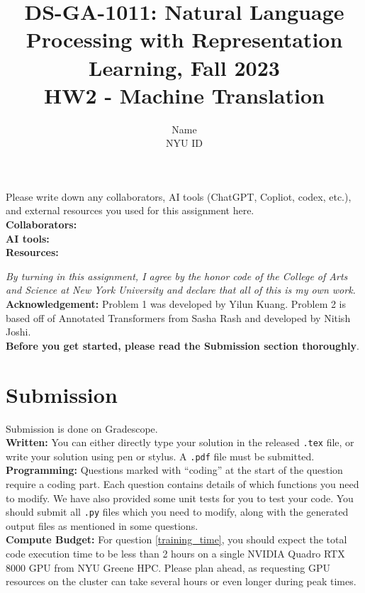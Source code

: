 \documentclass{article}
\title{\textbf{DS-GA-1011: Natural Language Processing with Representation Learning, Fall 2023}\\HW2 - Machine Translation}
\author{Name \\
NYU ID}
\date{}
\theoremstyle{case}
\theoremstyle{definition}
\begin{document}
\maketitle
\begin{tcolorbox}
Please write down any collaborators, AI tools (ChatGPT, Copliot, codex, etc.), and external resources you used for this assignment here. \\
\textbf{Collaborators:} \\
\textbf{AI tools:} \\
\textbf{Resources:} 
\end{tcolorbox}

\textit{By turning in this assignment, I agree by the honor code of the College of Arts and Science at New York University and declare
that all of this is my own work.} \\

\textbf{Acknowledgement:} Problem 1 was developed by Yilun Kuang. Problem 2 is based off of Annotated Transformers from Sasha Rash and developed by Nitish Joshi. \\

\textbf{Before you get started, please read the Submission section thoroughly}.

\section*{Submission}
Submission is done on Gradescope. \\

\textbf{Written:} You can either directly type your solution in the released \texttt{.tex} file,
or write your solution using pen or stylus. 
A \texttt{.pdf} file must be submitted.\\

\textbf{Programming:} Questions marked with ``coding'' at the start of the question require a coding part. Each question contains details of which functions you need to modify. We have also provided some unit tests for you to test your code. You should submit all \texttt{.py} files which you need to modify, along with the generated output files as mentioned in some questions. \\

\textbf{Compute Budget:} For question \ref{training_time}, you should expect the total code execution time to be less than 2 hours on a single NVIDIA Quadro RTX 8000 GPU from NYU Greene HPC. Please plan ahead, as requesting GPU resources on the cluster can take several hours or even longer during peak times. \\
\end{document}
